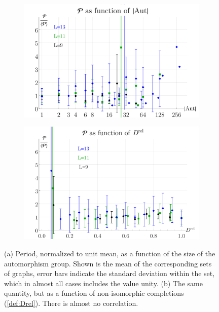 \documentclass[12pt,a4paper]{article}
\renewcommand{\|}{\rule[-0.4ex]{0.2ex}{1.2em}}
\begin{document}
\begin{figure}[htbp]
	\begin{subfigure}[b]{.49 \textwidth}
		\includegraphics[width=\linewidth]{P_Aut}
		\subcaption{}
		\label{fig:P_Aut}
	\end{subfigure}
	\begin{subfigure}[b]{.48 \textwidth}
	\includegraphics[width=\linewidth]{P_Drel}
	\subcaption{}
	\label{fig:P_Drel}
\end{subfigure}
	
	\caption{(a) Period, normalized to unit mean, as a function of the size of the automorphism group.  Shown is the mean of the corresponding sets of graphs, error bars indicate the standard deviation within the set, which in almost all cases  includes the value unity. (b) The same quantity, but as a function of non-isomorphic completions (\cref{def:Drel}). There is almost no correlation. }
	
\end{figure}
\end{document}
